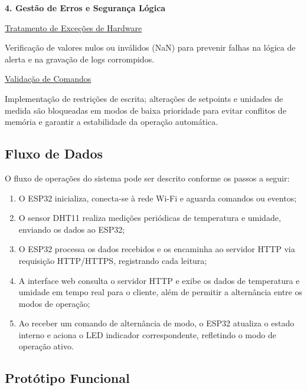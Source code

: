 \vspace{0.5cm}

\textbf{4. Gestão de Erros e Segurança Lógica}

\underline{Tratamento de Exceções de Hardware}

    Verificação de valores nulos ou inválidos (NaN) para prevenir falhas na lógica de alerta e na gravação de logs corrompidos.

\underline{Validação de Comandos}

    Implementação de restrições de escrita; alterações de setpoints e unidades de medida são bloqueadas em modos de baixa prioridade para evitar conflitos de memória e garantir a estabilidade da operação automática.



\subsection{Fluxo de Dados}

O fluxo de operações do sistema pode ser descrito conforme os passos a seguir:

\begin{enumerate}

    \item O ESP32 inicializa, conecta-se à rede Wi-Fi e aguarda comandos ou eventos;
    
    \item O sensor DHT11 realiza medições periódicas de temperatura e umidade, enviando os dados ao ESP32;
    
    \item O ESP32 processa os dados recebidos e os encaminha ao servidor HTTP via requisição HTTP/HTTPS, registrando cada leitura;

    \item A interface web consulta o servidor HTTP e exibe os dados de temperatura e umidade em tempo real para o cliente, além de permitir a alternância entre os modos de operação;

    \item Ao receber um comando de alternância de modo, o ESP32 atualiza o estado interno e aciona o LED indicador correspondente, refletindo o modo de operação ativo. 

\end{enumerate}

\subsection{Protótipo Funcional}

